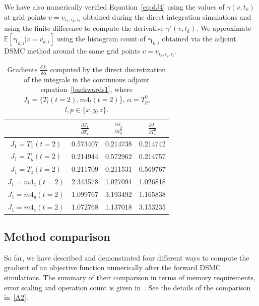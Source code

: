 \documentclass[times,final,nopreprintline]{elsarticle}
\newcommand{\bgamma}{\boldsymbol \gamma}
\begin{document}
We have also numerically verified Equation~\eqref{eq:dJ4} using the values of $\gamma(v,t_k)$ at grid points $v=v_{i_x,i_y,i_z}$ obtained during the direct integration simulations and using the finite difference to compute the derivative $\gamma'(v,t_k)$. We approximate $\mathbb E[\bgamma_{k,i}|v=v_{k,i}]$ using the histogram count of $\bgamma_{k,i}$ obtained via the adjoint DSMC method around the same grid points $v=v_{i_x,i_y,i_z}$.




\begin{table} %
\small
\centering 
\begin{tabular}{|c|c|c|c|} 
  \hline
   & $\frac{\partial J_1}{\partial T_x^0}$ & $\frac{\partial J_1}{\partial T_y^0}$ & $\frac{\partial J_1}{\partial T_z^0}$ \\
  \hline
$J_1=T_x(t=2)$  &  0.573407   &  0.214738   &  0.214742  \\ 
$J_1=T_y(t=2)$  &  0.214944   &  0.572962   &  0.214757  \\
$J_1=T_z(t=2)$  &  0.211709   &  0.211531   &  0.569767  \\
$J_1=m4_x(t=2)$ &  2.343578   &  1.027094   &  1.026818  \\
$J_1=m4_y(t=2)$ &  1.099767   &  3.193492   &  1.165838  \\
$J_1=m4_z(t=2)$ &  1.072768   &  1.137018   &  3.153235  \\
   \hline
\end{tabular} 
\caption{Gradients $\frac{\delta J_1}{\delta \alpha}$ computed by the direct discretization of the integrals in the continuous adjoint equation~\eqref{backwards1}, where $J_1=\{T_l(t=2),m4_l(t=2)$\}, $\alpha=T_p^0$, $l,p\in\{x,y,z\}$.}\label{Table6}
\end{table} 








\subsection{Method comparison}
So far, we have described and demonstrated four different ways to compute the gradient of an objective function numerically after the forward DSMC simulations. The summary of their comparison in terms of memory requirements, error scaling and operation count is given in~. See the details of the comparison in~\ref{A2}.
\end{document}
